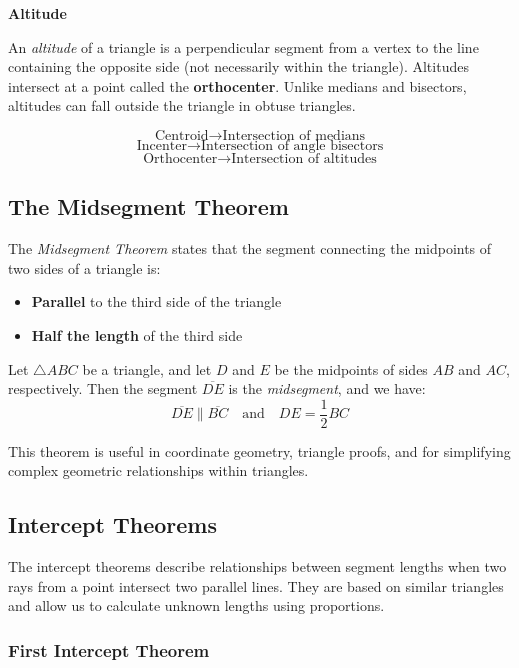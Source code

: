 \textbf{Altitude}

An \emph{altitude} of a triangle is a perpendicular segment from a vertex to the line containing the opposite side (not necessarily within the triangle). Altitudes intersect at a point called the \textbf{orthocenter}. Unlike medians and bisectors, altitudes can fall outside the triangle in obtuse triangles.

\[
\text{Centroid} \rightarrow \text{Intersection of medians}\]
\[
\text{Incenter} \rightarrow \text{Intersection of angle bisectors}\]
\[
\text{Orthocenter} \rightarrow \text{Intersection of altitudes}
\]

\subsection{The Midsegment Theorem}

The \emph{Midsegment Theorem} states that the segment connecting the midpoints of two sides of a triangle is:

\begin{itemize}[label=\(-\)]
    \item \textbf{Parallel} to the third side of the triangle
    \item \textbf{Half the length} of the third side
\end{itemize}

Let \( \triangle ABC \) be a triangle, and let \( D \) and \( E \) be the 
midpoints of sides \( AB \) and \( AC \), respectively. Then the segment \( \overline{DE} \) is 
the \emph{midsegment}, and we have:
\[
\overline{DE} \parallel \overline{BC} \quad \text{and} \quad DE = \frac{1}{2} BC
\]

This theorem is useful in coordinate geometry, triangle proofs, 
and for simplifying complex geometric relationships within triangles.

\subsection{Intercept Theorems}

The intercept theorems describe relationships between segment lengths when two rays from a point intersect two parallel lines. They are based on similar triangles and allow us to calculate unknown lengths using proportions.

\subsubsection{First Intercept Theorem}

